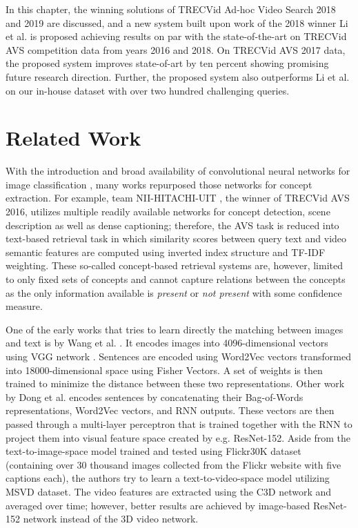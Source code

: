 In this chapter, the winning solutions of TRECVid Ad-hoc Video Search 2018 and 2019 are discussed, and a new system built upon work of the 2018 winner Li et al. \cite{XirongW2VVpp} is proposed achieving results on par with the state-of-the-art on TRECVid AVS competition data from years 2016 and 2018. On TRECVid AVS 2017 data, the proposed system improves state-of-art by ten percent showing promising future research direction. Further, the proposed system also outperforms Li et al. on our in-house dataset with over two hundred challenging queries.

\section{Related Work}\label{sec:chap2relatedwork}
With the introduction and broad availability of convolutional neural networks for image classification \cite{AlexNet,vgg,Szegedy_2016_InceptionV3}, many works repurposed those networks for concept extraction. 
For example, team NII-HITACHI-UIT \cite{le2016nii}, the winner of TRECVid AVS 2016, utilizes multiple readily available networks for concept detection, scene description as well as dense captioning; therefore, the AVS task is reduced into text-based retrieval task in which similarity scores between query text and video semantic features are computed using inverted index structure and TF-IDF weighting.
These so-called concept-based retrieval systems are, however, limited to only fixed sets of concepts and cannot capture relations between the concepts as the only information available is \textit{present} or \textit{not present} with some confidence measure.

One of the early works that tries to learn directly the matching between images and text is by Wang et al. \cite{Wang2019}. It encodes images into 4096-dimensional vectors using VGG network \cite{vgg}. Sentences are encoded using Word2Vec \cite{word2vec} vectors transformed into 18000-dimensional space using Fisher Vectors. A set of weights is then trained to minimize the distance between these two representations.
Other work by Dong et al. \cite{Dong2018} encodes sentences by concatenating their Bag-of-Words representations, Word2Vec vectors, and RNN outputs. These vectors are then passed through a multi-layer perceptron that is trained together with the RNN to project them into visual feature space created by e.g. ResNet-152. Aside from the text-to-image-space model trained and tested using Flickr30K dataset~\cite{Flickr30k} (containing over 30 thousand images collected from the Flickr website with five captions each), the authors try to learn a text-to-video-space model utilizing MSVD dataset. The video features are extracted using the C3D network and averaged over time; however, better results are achieved by image-based ResNet-152 network instead of the 3D video network.

